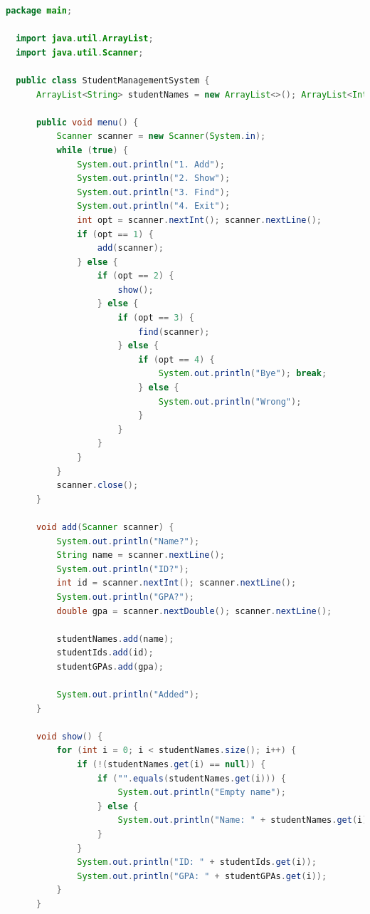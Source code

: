 \documentclass[a4paper,12pt]{article}
\begin{document}
\begin{lstlisting}[language=Java, caption={Refactored Code Generated by jSparrow}, label={lst:jsparrow-result}]
  package main;

  import java.util.ArrayList;
  import java.util.Scanner;
  
  public class StudentManagementSystem {
      ArrayList<String> studentNames = new ArrayList<>(); ArrayList<Integer> studentIds = new ArrayList<>(); ArrayList<Double> studentGPAs = new ArrayList<>();;
  
      public void menu() {
          Scanner scanner = new Scanner(System.in);
          while (true) {
              System.out.println("1. Add");
              System.out.println("2. Show");
              System.out.println("3. Find");
              System.out.println("4. Exit");
              int opt = scanner.nextInt(); scanner.nextLine();
              if (opt == 1) {
                  add(scanner);
              } else {
                  if (opt == 2) {
                      show();
                  } else {
                      if (opt == 3) {
                          find(scanner);
                      } else {
                          if (opt == 4) {
                              System.out.println("Bye"); break;
                          } else {
                              System.out.println("Wrong");
                          }
                      }
                  }
              }
          }
          scanner.close();
      }
  
      void add(Scanner scanner) {
          System.out.println("Name?");
          String name = scanner.nextLine();
          System.out.println("ID?");
          int id = scanner.nextInt(); scanner.nextLine();
          System.out.println("GPA?");
          double gpa = scanner.nextDouble(); scanner.nextLine();
  
          studentNames.add(name);
          studentIds.add(id);
          studentGPAs.add(gpa);
  
          System.out.println("Added");
      }
  
      void show() {
          for (int i = 0; i < studentNames.size(); i++) {
              if (!(studentNames.get(i) == null)) {
                  if ("".equals(studentNames.get(i))) {
                      System.out.println("Empty name");
                  } else {
                      System.out.println("Name: " + studentNames.get(i));
                  }
              }
              System.out.println("ID: " + studentIds.get(i));
              System.out.println("GPA: " + studentGPAs.get(i));
          }
      }
  

\end{lstlisting}
\end{document}
